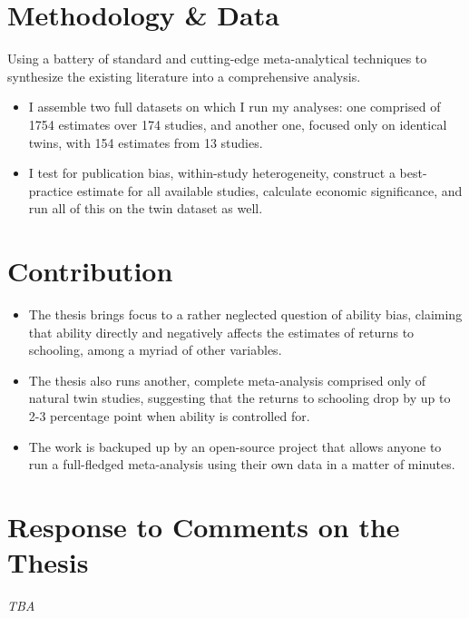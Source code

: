 \documentclass[12pt]{article}
\begin{document}
\section*{Methodology \& Data}

Using a battery of standard and cutting-edge meta-analytical techniques to synthesize the existing literature into a comprehensive analysis.

\begin{itemize}
    \item I assemble two full datasets on which I run my analyses: one comprised of 1754 estimates over 174 studies, and another one, focused only on identical twins, with 154 estimates from 13 studies.
    \item I test for publication bias, within-study heterogeneity, construct a best-practice estimate for all available studies, calculate economic significance, and run all of this on the twin dataset as well.
\end{itemize}

\section*{Contribution}

\begin{itemize}
    \item The thesis brings focus to a rather neglected question of ability bias, claiming that ability directly and negatively affects the estimates of returns to schooling, among a myriad of other variables.
    \item The thesis also runs another, complete meta-analysis comprised only of natural twin studies, suggesting that the returns to schooling drop by up to 2-3 percentage point when ability is controlled for.
    \item The work is backuped up by an open-source project that allows anyone to run a full-fledged meta-analysis using their own data in a matter of minutes.

\end{itemize}

\section*{Response to Comments on the Thesis}
\textit{TBA}
\end{document}
